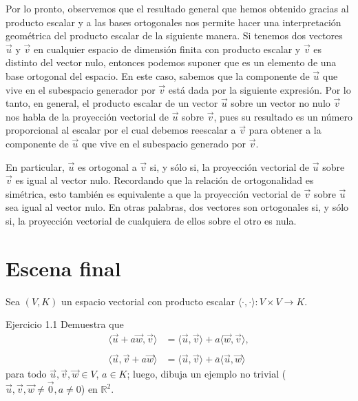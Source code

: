 \documentclass[12pt,dvipsnames]{article}
\numberwithin{equation}{section}
\begin{document}
Por lo pronto, observemos que el resultado general que hemos obtenido gracias al producto escalar y a las bases ortogonales nos permite hacer una interpretación geométrica del producto escalar de la siguiente manera. Si tenemos dos vectores $\vec{u}$ y $\vec{v}$ en cualquier espacio de dimensión finita con producto escalar y $\vec{v}$ es distinto del vector nulo, entonces podemos suponer que es un elemento de una base ortogonal del espacio. En este caso, sabemos que la componente de $\vec{u}$ que vive en el subespacio generador por $\vec{v}$ está dada por la siguiente expresión. Por lo tanto, en general, el producto escalar de un vector $\vec{u}$ sobre un vector no nulo $\vec{v}$ nos habla de la proyección vectorial de $\vec{u}$ sobre $\vec{v}$, pues su resultado es un número proporcional al escalar por el cual debemos reescalar a $\vec{v}$ para obtener a la componente de $\vec{u}$ que vive en el subespacio generado por $\vec{v}$. 

En particular, $\vec{u}$ es ortogonal a $\vec{v}$ si, y sólo si, la proyección vectorial de $\vec{u}$ sobre $\vec{v}$ es igual al vector nulo. Recordando que la relación de ortogonalidad es simétrica, esto también es equivalente a que la proyección vectorial de $\vec{v}$ sobre $\vec{u}$ sea igual al vector nulo. En otras palabras, dos vectores son ortogonales si, y sólo si, la proyección vectorial de cualquiera de ellos sobre el otro es nula.


\newpage
\section{Escena final}

\begin{center}
    Sea $(V,K)$ un espacio vectorial con producto escalar $\langle\cdot,\cdot\rangle:V\times V\to K$.
\end{center}

Ejercicio 1.1 Demuestra que %
\begin{align*}
    \langle \vec{u} + a\vec{w}, \vec{v}\rangle &= \langle \vec{u},\vec{v}\rangle + a\langle \vec{w}, \vec{v}\rangle, \\
    \\
    \langle \vec{u}, \vec{v} + a\vec{w}\rangle &= \langle \vec{u},\vec{v}\rangle + \overline{a}\langle \vec{u}, \vec{w}\rangle
\end{align*} para todo $\vec{u},\vec{v},\vec{w}\in V$, $a\in K$; luego, dibuja un ejemplo no trivial ($\vec{u},\vec{v},\vec{w}\neq\vec{0}, a\neq 0$) en $\mathbb{R}^2$. \\
\end{document}
